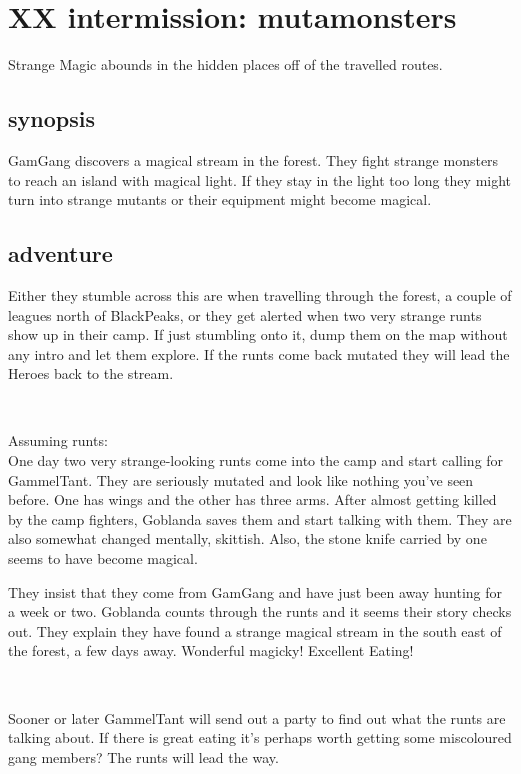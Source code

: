 \section*{XX intermission: mutamonsters}
\label{xxmutamonsters}

Strange Magic abounds in the hidden places off of the travelled routes.


\subsection*{synopsis}
GamGang discovers a magical stream in the forest. They fight strange monsters to reach an island with magical light. If they stay in the light too long they might turn into strange mutants or their equipment might become magical.


\subsection*{adventure}
Either they stumble across this are when travelling through the forest, a couple of leagues north of BlackPeaks, or they get alerted when two very strange runts show up in their camp. If just stumbling onto it, dump them on the map without any intro and let them explore. If the runts come back mutated they will lead the Heroes back to the stream.

\

Assuming runts:\\
One day two very strange-looking runts come into the camp and start calling for GammelTant. They are seriously mutated and look like nothing you've seen before. One has wings and the other has three arms. After almost getting killed by the camp fighters, Goblanda saves them and start talking with them. They are also somewhat changed mentally, skittish. Also, the stone knife carried by one seems to have become magical.

They insist that they come from GamGang and have just been away hunting for a week or two. Goblanda counts through the runts and it seems their story checks out. They explain they have found a strange magical stream in the south east of the forest, a few days away. Wonderful magicky! Excellent Eating!

\

Sooner or later GammelTant will send out a party to find out what the runts are talking about. If there is great eating it's perhaps worth getting some miscoloured gang members? The runts will lead the way.

